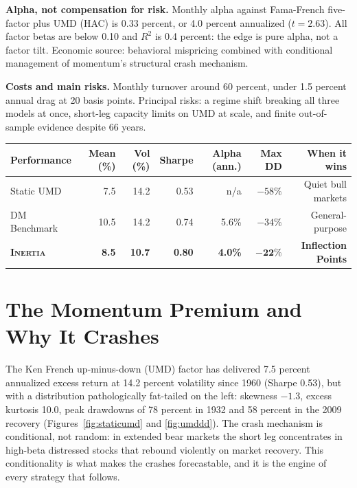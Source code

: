 \documentclass[12pt]{article}
\renewcommand{\arraystretch}{1.1}
\newcommand{\fundname}{\textsc{Inertia}}
\begin{document}
\textbf{Alpha, not compensation for risk.} Monthly alpha against Fama-French five-factor plus
UMD (HAC) is 0.33 percent, or 4.0 percent annualized ($t = 2.63$). All factor betas are below
0.10 and $R^2$ is 0.4 percent: the edge is pure alpha, not a factor tilt. Economic source:
behavioral mispricing combined with conditional management of momentum's structural crash
mechanism.

\textbf{Costs and main risks.} Monthly turnover around 60 percent, under 1.5 percent annual
drag at 20 basis points. Principal risks: a regime shift breaking all three models at once,
short-leg capacity limits on UMD at scale, and finite out-of-sample evidence despite 66 years.

\vspace{0.1em}
{\renewcommand{\arraystretch}{0.95}
\begin{center}
\footnotesize
\begin{tabularx}{0.95\textwidth}{l r r r r r r}
\toprule
\textbf{Performance} & Mean (\%) & Vol (\%) & Sharpe & Alpha (ann.) & Max DD & When it wins \\
\midrule
Static UMD    &  7.5 & 14.2 & 0.53 & n/a  & $-58\%$ & Quiet bull markets \\
DM Benchmark  & 10.5 & 14.2 & 0.74 & 5.6\% & $-34\%$ & General-purpose \\
\rowcolor{softgrey}
\textbf{\fundname{}} & \textbf{8.5} & \textbf{10.7} & \textbf{0.80} & \textbf{4.0\%} & $\mathbf{-22\%}$ & \textbf{Inflection Points} \\
\bottomrule
\end{tabularx}
\end{center}}

\clearpage

\section{The Momentum Premium and Why It Crashes}

The Ken French up-minus-down (UMD) factor has delivered 7.5 percent annualized excess return
at 14.2 percent volatility since 1960 (Sharpe 0.53), but with a distribution pathologically
fat-tailed on the left: skewness $-1.3$, excess kurtosis 10.0, peak drawdowns of 78 percent in
1932 and 58 percent in the 2009 recovery (Figures~\ref{fig:staticumd} and \ref{fig:umddd}).
The crash mechanism is conditional, not random: in extended bear markets the short leg
concentrates in high-beta distressed stocks that rebound violently on market recovery. This
conditionality is what makes the crashes forecastable, and it is the engine of every
strategy that follows.
\end{document}
